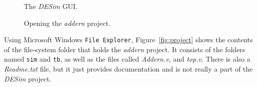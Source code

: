 \documentclass[epsfig,10pt,fullpage]{article} \addtolength{\textwidth}{1.5in}
\begin{document}
\begin{figure}[t]
	\begin{center}
        \setlength{\fboxsep}{0pt}
	\end{center}
		  \caption{The {\it DESim} GUI.}
	\label{fig:gui}
\end{figure}

\begin{figure}[t]
	\begin{center}
        \setlength{\fboxsep}{0pt}
	\end{center}
		  \caption{Opening the {\it addern} project.}
	\label{fig:open}
\end{figure}
\clearpage
\newpage
\noindent
Using Microsoft Windows \texttt{File Explorer}, Figure~\ref{fig:project} shows the
contents of the file-system folder that holds the {\it addern} project. It consists of the 
folders named \texttt{sim} and \texttt{tb}, as well as the files called {\it Addern.v}, 
and {\it top.v}. There is also a {\it Readme.txt} file, but it just provides 
documentation and is not really a part of the {\it DESim} project. 
\end{document}
